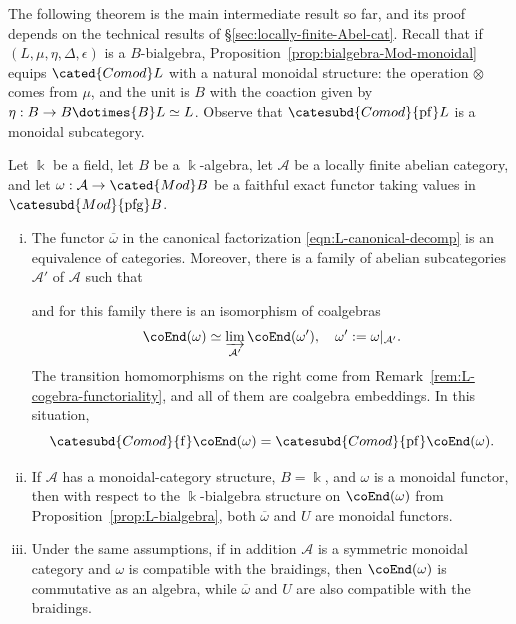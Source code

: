 The following theorem is the main intermediate result so far, and its proof
depends on the technical results of \S\ref{sec:locally-finite-Abel-cat}.
Recall that if $(L,\mu,\eta,\Delta,\epsilon)$ is a $B$-bialgebra,
Proposition~\ref{prop:bialgebra-Mod-monoidal} equips
$\cated{Comod}L$ with a natural monoidal structure: the operation $\otimes$
comes from $\mu$, and the unit is $B$ with the coaction given by
$\eta:B\to B\dotimes{B}L\simeq L$. Observe that
$\catesubd{Comod}{\mathrm{pf}}L$ is a monoidal subcategory.

\begin{theorem}\label{prop:Tannaka-aux1}
	Let $\Bbbk$ be a field, let $B$ be a $\Bbbk$-algebra, let $\mathcal{A}$
	be a locally finite abelian category, and let
	$\omega:\mathcal{A}\to\cated{Mod}B$ be a faithful exact functor taking
	values in $\catesubd{Mod}{\mathrm{pfg}}B$.
	\begin{enumerate}[(i)]
		\item The functor $\overline\omega$ in the canonical factorization
		\eqref{eqn:L-canonical-decomp} is an equivalence of categories.
		Moreover, there is a family of abelian subcategories $\mathcal{A}'$ of
		$\mathcal{A}$ such that
		and for this family there is an isomorphism of coalgebras
		\[ \coEnd(\omega) \simeq \varinjlim_{\mathcal{A}'} \coEnd(\omega'), \quad \omega' := \omega|_{\mathcal{A}'}. \]
		The transition homomorphisms on the right come from
		Remark~\ref{rem:L-cogebra-functoriality}, and all of them are coalgebra
		embeddings. In this situation,
		\[ \catesubd{Comod}{\mathrm f}\coEnd(\omega)=
		\catesubd{Comod}{\mathrm{pf}}\coEnd(\omega). \]

		\item If $\mathcal{A}$ has a monoidal-category structure,
		$B=\Bbbk$, and $\omega$ is a monoidal functor, then with respect to the
		$\Bbbk$-bialgebra structure on $\coEnd(\omega)$ from
		Proposition~\ref{prop:L-bialgebra}, both $\overline\omega$ and $U$ are
		monoidal functors.
		\item Under the same assumptions, if in addition $\mathcal{A}$ is a
		symmetric monoidal category and $\omega$ is compatible with the
		braidings, then $\coEnd(\omega)$ is commutative as an algebra, while
		$\overline\omega$ and $U$ are also compatible with the braidings.
	\end{enumerate}
\end{theorem}
